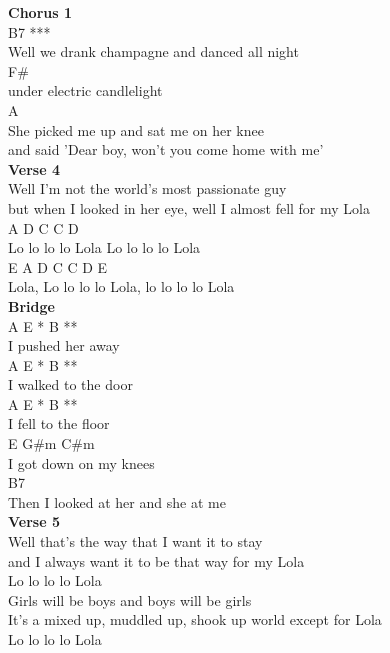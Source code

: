 \documentclass[a4paper]{article}
\begin{document}
{{        }
        \textbf{Chorus 1}
        ~\\
        {
            \cutive
            \obeyspaces
        B7 ***
\\
Well we drank champagne and danced all night
\\
F\#
\\
under electric candlelight
\\
    A
\\
She picked me up and sat me on her knee
\\
and said 'Dear boy, won't you come home with me'
\\

        }
        \textbf{Verse 4}
        ~\\
        {
            \cutive
            \obeyspaces
Well I'm not the world's most passionate guy
\\
but when I looked in her eye, well I almost fell for my Lola
\\
            A    D            C   C  D
\\
Lo lo lo lo Lola  Lo lo lo lo Lola
\\
E                  A    D             C    C D   E
\\
Lola,  Lo lo lo lo Lola,  lo lo lo lo Lola
\\

        }
        \textbf{Bridge}
        ~\\
        {
            \cutive
            \obeyspaces
  A      E *  B **
\\
I pushed her away
\\
  A      E *    B **
\\
I walked to the door
\\
  A    E *    B **
\\
I fell to the floor
\\
      E    G\#m   C\#m
\\
I got down on my knees
\\
     B7
\\
Then I looked at her and she at me
\\

        }
        \textbf{Verse 5}
        ~\\
        {
            \cutive
            \obeyspaces
Well that's the way that I want it to stay
\\
and I always want it to be that way for my Lola
\\
Lo lo lo lo Lola
\\
Girls will be boys and boys will be girls
\\
It's a mixed up, muddled up, shook up world except for Lola
\\
Lo lo lo lo Lola
\\

}}
\end{document}
